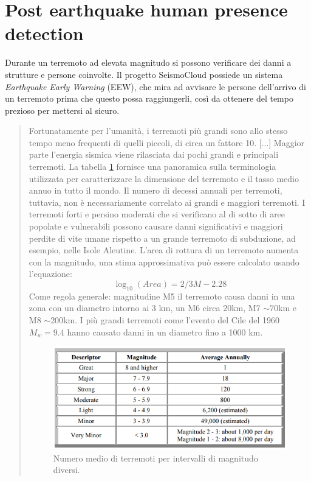 \documentclass[main.tex]{subfiles}
\begin{document}
\sloppy

\section{Post earthquake human presence detection}\label{sec:PostEarthquake}
Durante un terremoto ad elevata magnitudo si possono verificare dei danni a strutture e persone coinvolte. Il progetto SeismoCloud possiede un sistema \emph{Earthquake Early Warning} (EEW), che mira ad avvisare le persone dell'arrivo di un terremoto prima che questo possa raggiungerli, così da ottenere del tempo prezioso per mettersi al sicuro.\newline
\begin{quote}
Fortunatamente per l'umanità, i terremoti più grandi sono allo stesso tempo meno frequenti di quelli piccoli, di circa un fattore 10. [...] Maggior parte l'energia sismica viene rilasciata dai pochi grandi e principali terremoti. La tabella \ref{fig:earthquake-estimation} fornisce una panoramica sulla terminologia utilizzata per caratterizzare la dimensione del terremoto e il tasso medio annuo in tutto il mondo. Il numero di decessi annuali per terremoti, tuttavia, non è necessariamente correlato ai grandi e maggiori terremoti. I terremoti forti e persino moderati che si verificano al di sotto di aree popolate e vulnerabili possono causare danni significativi e maggiori perdite di vite umane rispetto a un grande terremoto di subduzione, ad esempio, nelle Isole Aleutine. L'area di rottura di un terremoto aumenta con la magnitudo, una stima approssimativa può essere calcolato usando l'equazione: \[\log_{10}(Area) = 2/3M-2.28\] Come regola generale: magnitudine M5 il terremoto causa danni in una zona con un diametro intorno ai 3 km, un M6 circa \(20\)km, M7 \(\sim{70}\)km e M8 \(\sim{200}\)km. I più grandi terremoti come l'evento del Cile del 1960 \(M_w=9.4\) hanno causato danni in un diametro fino a 1000 km.\cite{EarthquakePrediction}

\begin{figure}[H]
    \centering
    \includegraphics[]{img/Post-Earthquake/earthquake-estimation.PNG}
    \caption{Numero medio di terremoti per intervalli di magnitudo diversi\cite{EarthquakePrediction}.}
    \label{fig:earthquake-estimation}
\end{figure}
\end{quote}
\end{document}
